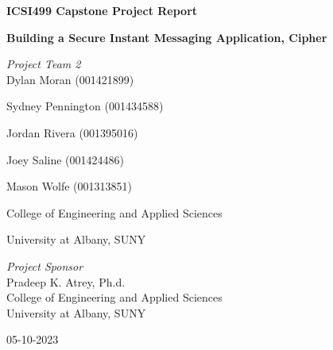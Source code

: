 \documentclass[12pt]{article}
\begin{document}

\begin{titlepage}
	\clearpage\thispagestyle{empty}
	\centering
	\vspace{1.5cm}
   {\normalsize
    \textbf{ICSI499 Capstone Project Report} \par
}
  	\vspace{1.5cm}
	{\Huge \textbf{Building a Secure Instant Messaging Application, Cipher}} 
	\vspace{1cm}
 
	\vspace{3cm}
	{\normalsize \textit{Project Team 2}\\
		\vspace{0.25cm}
	Dylan Moran (001421899)   

	             Sydney Pennington (001434588)
              
	             Jordan Rivera (001395016) 
              
                  Joey Saline (001424486)
                  
                  Mason Wolfe (001313851)
                  
	             College of Engineering and Applied Sciences
              
	             University at Albany, SUNY \par}
	\vspace{4cm}
 
    {\normalsize
    \textit{Project Sponsor}\\
        \vspace{0.25cm}
    Pradeep K. Atrey, Ph.d.\\
    \vspace{0.25cm}
    College of Engineering and Applied Sciences\\
    \vspace{0.05cm}
    University at Albany, SUNY \\
   
    \vspace{0.25cm} 
     \par
}
    \vspace{3cm}
		
	{\normalsize 05-10-2023 \par}
	
	\pagebreak


\end{titlepage}
	
\end{document}
